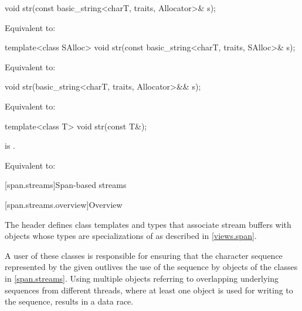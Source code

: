 %
\begin{itemdecl}
void str(const basic_string<charT, traits, Allocator>& s);
\end{itemdecl}

\begin{itemdescr}
\pnum
\effects
Equivalent to: 
\end{itemdescr}

%
\begin{itemdecl}
template<class SAlloc>
  void str(const basic_string<charT, traits, SAlloc>& s);
\end{itemdecl}

\begin{itemdescr}
\pnum
\effects
Equivalent to: 
\end{itemdescr}

%
\begin{itemdecl}
void str(basic_string<charT, traits, Allocator>&& s);
\end{itemdecl}

\begin{itemdescr}
\pnum
\effects
Equivalent to: 
\end{itemdescr}

%
\begin{itemdecl}
template<class T>
  void str(const T&);
\end{itemdecl}

\begin{itemdescr}
\pnum
\constraints
{}
is .

\pnum
\effects
Equivalent to: 
\end{itemdescr}

[span.streams]{Span-based streams}

[span.streams.overview]{Overview}

\pnum
The header  defines class templates and types
that associate stream buffers with objects whose types are
specializations of  as described in \ref{views.span}.
\begin{note}
A user of these classes is responsible for ensuring
that the character sequence represented by the given 
outlives the use of the sequence by objects of the classes in \ref{span.streams}.
Using multiple  objects
referring to overlapping underlying sequences from different threads,
where at least one  object is used
for writing to the sequence,
results in a data race.
\end{note}

